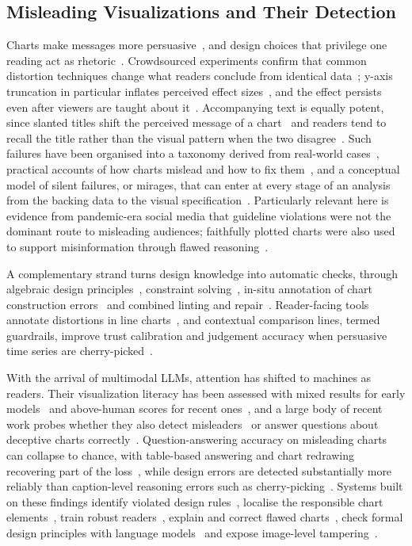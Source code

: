 \documentclass[conference]{IEEEtran}
\begin{document}
\subsection{Misleading Visualizations and Their Detection}

Charts make messages more persuasive~\cite{pandey2014}, and design choices that privilege one reading act as rhetoric~\cite{hullman2011}. Crowdsourced experiments confirm that common distortion techniques change what readers conclude from identical data~\cite{pandey2015deceptive}; y-axis truncation in particular inflates perceived effect sizes~\cite{correll2020}, and the effect persists even after viewers are taught about it~\cite{yang2021}. Accompanying text is equally potent, since slanted titles shift the perceived message of a chart~\cite{kong2018} and readers tend to recall the title rather than the visual pattern when the two disagree~\cite{kong2019}. Such failures have been organised into a taxonomy derived from real-world cases~\cite{lo2022misinformed}, practical accounts of how charts mislead and how to fix them~\cite{szafir2018}, and a conceptual model of silent failures, or mirages, that can enter at every stage of an analysis from the backing data to the visual specification~\cite{mcnutt2020}. Particularly relevant here is evidence from pandemic-era social media that guideline violations were not the dominant route to misleading audiences; faithfully plotted charts were also used to support misinformation through flawed reasoning~\cite{lisnic2023}.

A complementary strand turns design knowledge into automatic checks, through algebraic design principles~\cite{kindlmann2014}, constraint solving~\cite{moritz2019draco}, in-situ annotation of chart construction errors~\cite{hopkins2020} and combined linting and repair~\cite{chen2022vizlinter}. Reader-facing tools annotate distortions in line charts~\cite{fan2022}, and contextual comparison lines, termed guardrails, improve trust calibration and judgement accuracy when persuasive time series are cherry-picked~\cite{nadib2026}.

With the arrival of multimodal LLMs, attention has shifted to machines as readers. Their visualization literacy has been assessed with mixed results for early models~\cite{bendeck2025} and above-human scores for recent ones~\cite{seto2026}, and a large body of recent work probes whether they also detect misleaders~\cite{seto2026,alexander2024,lo2025,blasilli2026} or answer questions about deceptive charts correctly~\cite{chen2025,bharti2024,mahbub2025,mahbub2026}. Question-answering accuracy on misleading charts can collapse to chance, with table-based answering and chart redrawing recovering part of the loss~\cite{tonglet2026}, while design errors are detected substantially more reliably than caption-level reasoning errors such as cherry-picking~\cite{lalai2026}. Systems built on these findings identify violated design rules~\cite{tonglet2026b}, localise the responsible chart elements~\cite{kim2025}, train robust readers~\cite{zhang2026}, explain and correct flawed charts~\cite{das2026,bonas2026}, check formal design principles with language models~\cite{sinnona2026,sinnona2026b} and expose image-level tampering~\cite{song2026}.
\end{document}
